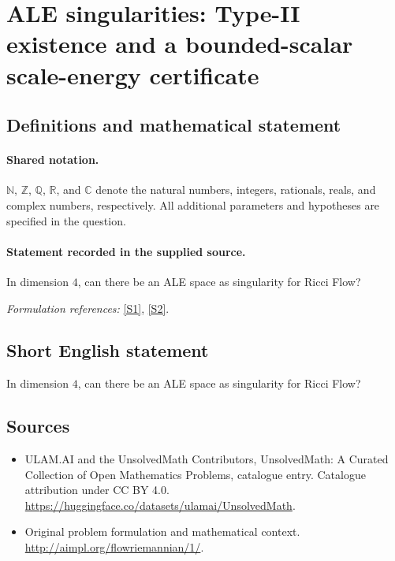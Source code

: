 \documentclass[11pt]{article}
\newcommand{\sref}[2]{\hyperlink{source:#1:#2}{[S#2]}}
\begin{document}
\section{ALE singularities: Type-II existence and a bounded-scalar scale-energy certificate}\label{statement}

\subsection{Definitions and mathematical statement}

\paragraph{Shared notation.}$\mathbb N$, $\mathbb Z$, $\mathbb Q$, $\mathbb R$, and $\mathbb C$ denote the natural numbers, integers, rationals, reals, and complex numbers, respectively. All additional parameters and hypotheses are specified in the question.


\paragraph{Statement recorded in the supplied source.}
In dimension $4$, can there be an ALE space as singularity for Ricci Flow?
\par\smallskip\textit{Formulation references:} \sref{statement}{1}, \sref{statement}{2}.
\subsection{Short English statement}
In dimension $4$, can there be an ALE space as singularity for Ricci Flow?
\subsection{Sources}
\begin{itemize}
\item[\hypertarget{source:statement:1}{S1}] ULAM.AI and the UnsolvedMath Contributors, UnsolvedMath: A Curated Collection of Open Mathematics Problems, catalogue entry. Catalogue attribution under CC BY 4.0.
\url{https://huggingface.co/datasets/ulamai/UnsolvedMath}.
\item[\hypertarget{source:statement:2}{S2}] Original problem formulation and mathematical context.
\url{http://aimpl.org/flowriemannian/1/}.
\end{itemize}
\label{end:statement}
\end{document}
